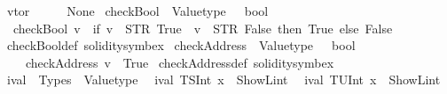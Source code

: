 \begin{isabellebody}
{\isacharbar}{\kern0pt}\ {\isachardoublequoteopen}vtor\ {\isacharunderscore}{\kern0pt}\ {\isacharunderscore}{\kern0pt}\ {\isacharunderscore}{\kern0pt}\ {\isacharunderscore}{\kern0pt}\ {\isacharequal}{\kern0pt}\ None{\isachardoublequoteclose}\isanewline
\isanewline
{}\isamarkupfalse%
\ checkBool\ {\isacharcolon}{\kern0pt}{\isacharcolon}{\kern0pt}\ {\isachardoublequoteopen}Valuetype\ \ {\isasymRightarrow}\ bool{\isachardoublequoteclose}\isanewline
{}\isanewline
\ \ {\isachardoublequoteopen}checkBool\ v\ {\isacharequal}{\kern0pt}\ {\isacharparenleft}{\kern0pt}if\ {\isacharparenleft}{\kern0pt}v\ {\isacharequal}{\kern0pt}\ STR\ {\isacharprime}{\kern0pt}{\isacharprime}{\kern0pt}True{\isacharprime}{\kern0pt}{\isacharprime}{\kern0pt}\ {\isasymor}\ v\ {\isacharequal}{\kern0pt}\ STR\ {\isacharprime}{\kern0pt}{\isacharprime}{\kern0pt}False{\isacharprime}{\kern0pt}{\isacharprime}{\kern0pt}{\isacharparenright}{\kern0pt}\ then\ True\ else\ False{\isacharparenright}{\kern0pt}{\isachardoublequoteclose}\isanewline
\isanewline
{}\isamarkupfalse%
\ checkBool{\isacharunderscore}{\kern0pt}def\ {\isacharbrackleft}{\kern0pt}solidity{\isacharunderscore}{\kern0pt}symbex{\isacharbrackright}{\kern0pt}\isanewline
\isanewline
{}\isamarkupfalse%
\ checkAddress\ {\isacharcolon}{\kern0pt}{\isacharcolon}{\kern0pt}\ {\isachardoublequoteopen}Valuetype\ \ {\isasymRightarrow}\ bool{\isachardoublequoteclose}\isanewline
\ \ \isanewline
\ \ \ \ {\isachardoublequoteopen}checkAddress\ v\ {\isacharequal}{\kern0pt}\ True{\isachardoublequoteclose}\isanewline
\isanewline
\isanewline
{}\isamarkupfalse%
\ checkAddress{\isacharunderscore}{\kern0pt}def\ {\isacharbrackleft}{\kern0pt}solidity{\isacharunderscore}{\kern0pt}symbex{\isacharbrackright}{\kern0pt}\isanewline
\isanewline
\isanewline
\isanewline
\isanewline
{}\isamarkupfalse%
\ ival\ {\isacharcolon}{\kern0pt}{\isacharcolon}{\kern0pt}\ {\isachardoublequoteopen}Types\ {\isasymRightarrow}\ Valuetype{\isachardoublequoteclose}\isanewline
{}\isanewline
\ \ {\isachardoublequoteopen}ival\ {\isacharparenleft}{\kern0pt}TSInt\ x{\isacharparenright}{\kern0pt}\ {\isacharequal}{\kern0pt}\ ShowL\isactrlsub i\isactrlsub n\isactrlsub t\ {}{\isachardoublequoteclose}\isanewline
{\isacharbar}{\kern0pt}\ {\isachardoublequoteopen}ival\ {\isacharparenleft}{\kern0pt}TUInt\ x{\isacharparenright}{\kern0pt}\ {\isacharequal}{\kern0pt}\ ShowL\isactrlsub i\isactrlsub n\isactrlsub t\ {}{\isachardoublequoteclose}\isanewline

\end{isabellebody}
